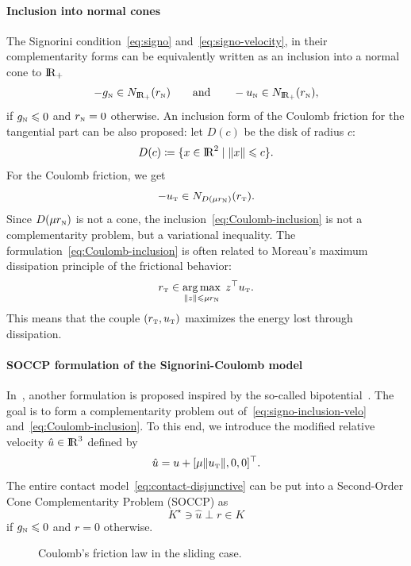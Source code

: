 {\paragraph{Inclusion into normal cones} The Signorini condition~\eqref{eq:signo} and~\eqref{eq:signo-velocity}, in their complementarity forms can be equivalently written  as an inclusion into a normal cone to $\mathrm{I\!R}_+$
\begin{equation}
 - g_\n \in N_{\RR_+}(r_\n)\qquad\text{and}\qquad
  - u_\n \in N_{\RR_+}(r_\n),
  \label{eq:signo-inclusion-velo}
\end{equation}
if $g_{{\hbox{\tiny{N}}}} \leqslant 0$ and $r_{\hbox{\tiny{N}}} =0 $ otherwise. An inclusion form of the Coulomb friction {for the tangential part} can be also proposed: let $D(c)$ be the disk of radius $c$:
\begin{equation}
  \label{eq:diskR}
  D(c) \coloneqq \{x\in \RR^2\mid \|x\| \leq c \}.
\end{equation}
For the Coulomb friction, we get
\begin{equation}
  \label{eq:Coulomb-inclusion}
  - u_{\t} \in N_{D(\mu r_\n)}(r_{\t}).
\end{equation}
Since $D(\mu r_{\hbox{\tiny{N}}})$ is not a cone, the inclusion~\eqref{eq:Coulomb-inclusion} is not a complementarity problem, but a variational inequality.
The formulation~\eqref{eq:Coulomb-inclusion} is often related to Moreau's maximum dissipation principle of the frictional behavior:
\begin{equation}
  \label{eq:moreau-maxprinciple}
  r_\t \in \argmax_{\|z\| \leq \mu r_\n}\;  z^\top u_\t.
\end{equation}
This means that the couple $(r_{\hbox{\tiny{T}}},u_{\hbox{\tiny{T}}})$ maximizes the energy lost through dissipation.


\paragraph{SOCCP formulation of the Signorini-Coulomb model}

In~\cite{Acary.Brogliato2008,Acary.ea_ZAMM2011}, another formulation is proposed inspired by the so-called bipotential~\cite{DeSaxce92,DeSaxce.Feng90,DeSaxce.Feng_MCM1998}.
{The goal is to form a complementarity problem out of~\eqref{eq:signo-inclusion-velo} and~\eqref{eq:Coulomb-inclusion}}.
To this end, we introduce the modified relative velocity $\hat u \in \mathrm{I\!R}^3$ defined by
\begin{equation}
  \label{eq:modified-velocity}
  \hat u = u + [\mu \|u_\t\|, 0, 0]^\top.
\end{equation}
The entire contact model~\eqref{eq:contact-disjunctive} can be put into a Second-Order Cone Complementarity Problem (SOCCP) as
\begin{equation}
  \label{eq:contact-SOCCP}
 K^\star \ni \hat u \perp r \in K
\end{equation}
 if $ g_{\hbox{\tiny{N}}} \leqslant 0 $ and $r=0$ otherwise. 
\begin{figure}\centering
  \resizebox{!}{0.5\textheight}{}
  \caption{Coulomb's friction law in the sliding case.}
\label{fig:CoulombLawSliding}
\end{figure}

}
